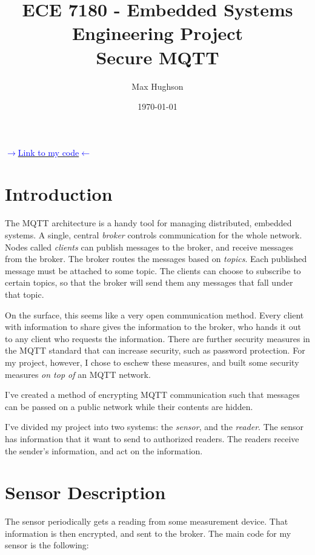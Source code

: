 \documentclass[final,titlepage,onecolumn]{article}
\title{ECE 7180 - Embedded Systems Engineering
Project \\
Secure MQTT}
\author{Max Hughson}
\date{\today}
\begin{document}
\maketitle

\begin{center}
\Large{\href{https://github.com/hughsonm/mqtt-embedded-project}{\textcolor{blue}{$ \rightarrow $Link to my code$ \leftarrow $}}}	
\end{center}
\normalsize

\section{Introduction}

The MQTT architecture is a handy tool for managing distributed, embedded systems. A single, central \emph{broker} controls communication for the whole network. Nodes called \emph{clients} can publish messages to the broker, and receive messages from the broker. The broker routes the messages based on \emph{topics}. Each published message must be attached to some topic. The clients can choose to subscribe to certain topics, so that the broker will send them any messages that fall under that topic.

On the surface, this seems like a very open communication method. Every client with information to share gives the information to the broker, who hands it out to any client who requests the information. There are further security measures in the MQTT standard that can increase security, such as password protection. For my project, however, I chose to eschew these measures, and built some security measures \emph{on top of} an MQTT network.

I've created a method of encrypting MQTT communication such that messages can be passed on a public network while their contents are hidden. 

I've divided my project into two systems: the \emph{sensor}, and the \emph{reader}. The sensor has information that it want to send to authorized readers. The readers receive the sender's information, and act on the information.

\section{Sensor Description}
The sensor periodically gets a reading from some measurement device. That information is then encrypted, and sent to the broker. The main code for my sensor is the following:
\lstset{style=Cpp}

\end{document}

